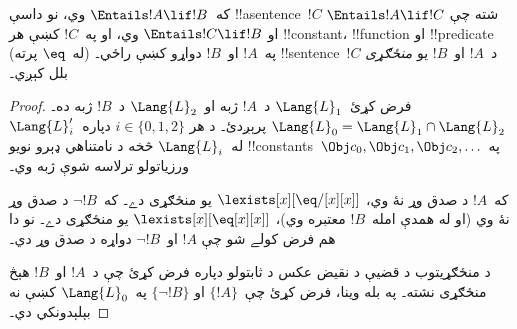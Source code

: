\documentclass[../../../include/open-logic-section]{subfiles}
\begin{document}


\begin{thm}
که~$\Entails !A \lif !B$ وي، نو داسې !!a{sentence}~$!C$ شته چې
$\Entails !A \lif !C$ او $\Entails !C \lif !B$ وي، او په~$!C$
کښې هر !!{constant}، !!{function} او !!{predicate} (له~$\eq$ پرته)
په~$!A$ او~$!B$ دواړو کښې راځي۔ !!{sentence}~$!C$ د~$!A$ او~$!B$
يو \emph{منځګړی} بلل کېږي۔
\end{thm}

\begin{proof}
فرض کړئ~$\Lang{L}_1$ د~$!A$ ژبه او~$\Lang{L}_2$ د~$!B$ ژبه ده۔
$\Lang{L}_0 = \Lang{L}_1 \cap \Lang{L}_2$ پرېږدئ۔ د هر
$i \in \{0, 1, 2 \}$ دپاره~$\Lang{L}'_i$ له~$\Lang{L}_i$ څخه د
نامتناهي ډېرو نويو !!{constant}s~$\Obj c_0, \Obj c_1, \Obj c_2,
\dots$ په ورزياتولو ترلاسه شوې ژبه وي۔

که~$!A$ د صدق وړ نۀ وي، $\lexists[x][\eq/[x][x]]$ يو منځګړی دے۔
که~$\lnot !B$ د صدق وړ نۀ وي (او له همدې امله~$!B$ معتبره وي)،
$\lexists[x][\eq[x][x]]$ يو منځګړی دے۔ نو دا هم فرض کولے شو چې
$!A$ او~$\lnot !B$ دواړه د صدق وړ دي۔

د منځګړيتوب د قضيې د نقيض عکس د ثابتولو دپاره فرض کړئ چې د~$!A$
او~$!B$ هېڅ منځګړی نشته۔ په بله وينا، فرض کړئ چې~$\{!A\}$ او
$\{\lnot !B\}$ په~$\Lang{L}_0$ کښې نه بېلېدونکي دي۔


\end{proof}
\end{document}
